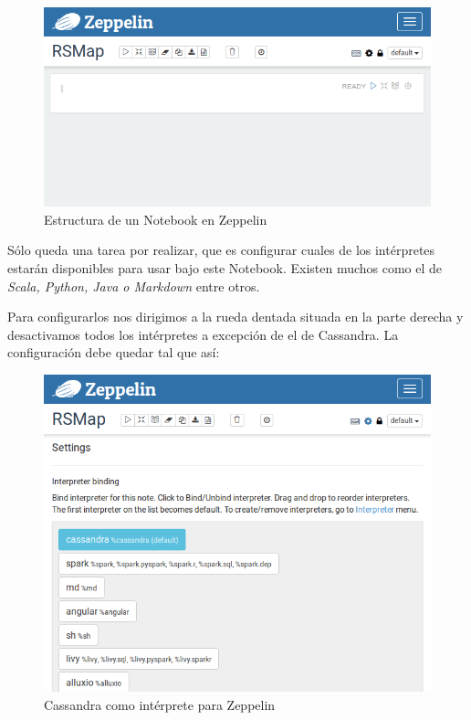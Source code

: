 \begin{figure}[!ht]
  \begin{center}
    \includegraphics[scale=0.50]{../images/zeppelin/2.png}
		\caption{Estructura de un Notebook en Zeppelin}
    \label{fig:kaa}
	\end{center}
\end{figure}

Sólo queda una tarea por realizar, que es configurar cuales de los intérpretes estarán disponibles para usar bajo este Notebook.
Existen muchos como el de \textit{Scala, Python, Java o Markdown} entre otros.

Para configurarlos nos dirigimos a la rueda dentada situada en la parte derecha y desactivamos todos los intérpretes a excepción de el de Cassandra. La configuración debe quedar tal que así:

\begin{figure}[!ht]
  \begin{center}
    \includegraphics[scale=0.50]{../images/zeppelin/3.png}
		\caption{Cassandra como intérprete para Zeppelin}
    \label{fig:kaa}
	\end{center}
\end{figure}

